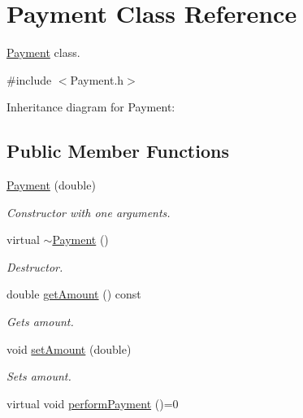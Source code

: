 \hypertarget{classPayment}{}\section{Payment Class Reference}
\label{classPayment}


\hyperlink{classPayment}{Payment} class.  




{\ttfamily \#include $<$Payment.\+h$>$}



Inheritance diagram for Payment\+:
\subsection*{Public Member Functions}
\begin{DoxyCompactItemize}
\item 
\hyperlink{classPayment_abe05f968db46b0211379eeee357ef58d}{Payment} (double)
\begin{DoxyCompactList}\small\item\em Constructor with one arguments. \end{DoxyCompactList}\item 
virtual \hyperlink{classPayment_acc52d8f5b5b333f8acd89611f4926082}{$\sim$\+Payment} ()\hypertarget{classPayment_acc52d8f5b5b333f8acd89611f4926082}{}\label{classPayment_acc52d8f5b5b333f8acd89611f4926082}

\begin{DoxyCompactList}\small\item\em Destructor. \end{DoxyCompactList}\item 
double \hyperlink{classPayment_a9852315e5da04ac1efb40fe78c1d1ab6}{get\+Amount} () const 
\begin{DoxyCompactList}\small\item\em Gets amount. \end{DoxyCompactList}\item 
void \hyperlink{classPayment_ae967c922e523959e20933da449e5d0fd}{set\+Amount} (double)
\begin{DoxyCompactList}\small\item\em Sets amount. \end{DoxyCompactList}\item 
virtual void \hyperlink{classPayment_afc011ab4bc8dee83b184bdc056d4c2a9}{perform\+Payment} ()=0\hypertarget{classPayment_afc011ab4bc8dee83b184bdc056d4c2a9}{}\label{classPayment_afc011ab4bc8dee83b184bdc056d4c2a9}


\end{DoxyCompactItemize}
